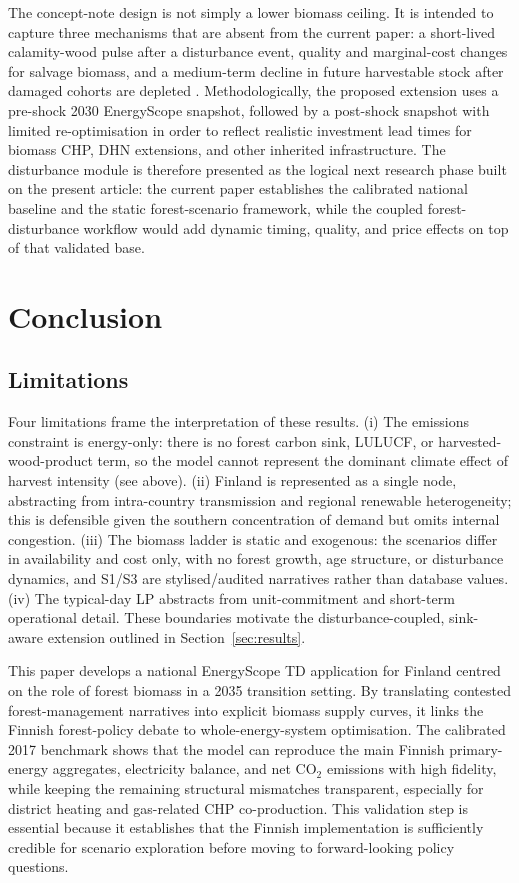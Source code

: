 \documentclass{article}
\begin{document}
The concept-note design is not simply a lower biomass ceiling. It is intended to capture three mechanisms that are absent from the current paper: a short-lived calamity-wood pulse after a disturbance event, quality and marginal-cost changes for salvage biomass, and a medium-term decline in future harvestable stock after damaged cohorts are depleted \citep{tothImpactsCalamityLogging2020,reckaRoleBiomassDecarbonisation2023}. Methodologically, the proposed extension uses a pre-shock 2030 EnergyScope snapshot, followed by a post-shock snapshot with limited re-optimisation in order to reflect realistic investment lead times for biomass CHP, DHN extensions, and other inherited infrastructure. The disturbance module is therefore presented as the logical next research phase built on the present article: the current paper establishes the calibrated national baseline and the static forest-scenario framework, while the coupled forest-disturbance workflow would add dynamic timing, quality, and price effects on top of that validated base.


\section{Conclusion}
\label{sec:conclusion}

\subsection{Limitations}
\label{sec:limitations}
Four limitations frame the interpretation of these results. (i) The emissions constraint is
energy-only: there is no forest carbon sink, LULUCF, or harvested-wood-product term, so the
model cannot represent the dominant climate effect of harvest intensity (see above).
(ii) Finland is represented as a single node, abstracting from intra-country transmission and
regional renewable heterogeneity; this is defensible given the southern concentration of
demand but omits internal congestion. (iii) The biomass ladder is static and exogenous: the
scenarios differ in availability and cost only, with no forest growth, age structure, or
disturbance dynamics, and S1/S3 are stylised/audited narratives rather than database values.
(iv) The typical-day LP abstracts from unit-commitment and short-term operational detail.
These boundaries motivate the disturbance-coupled, sink-aware extension outlined in
Section~\ref{sec:results}.

This paper develops a national EnergyScope TD application for Finland centred on the role of forest biomass in a 2035 transition setting. By translating contested forest-management narratives into explicit biomass supply curves, it links the Finnish forest-policy debate to whole-energy-system optimisation. The calibrated 2017 benchmark shows that the model can reproduce the main Finnish primary-energy aggregates, electricity balance, and net CO$_2$ emissions with high fidelity, while keeping the remaining structural mismatches transparent, especially for district heating and gas-related CHP co-production. This validation step is essential because it establishes that the Finnish implementation is sufficiently credible for scenario exploration before moving to forward-looking policy questions.
\end{document}
